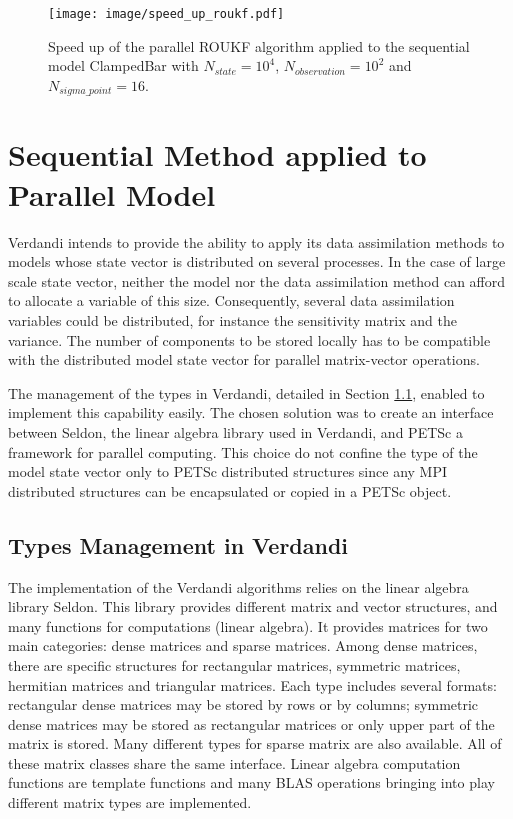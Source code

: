 \documentclass{tufte-book}
\begin{document}
 \begin{figure}
  \caption{\label{titre3} Speed up of the parallel ROUKF algorithm applied to the sequential model ClampedBar with $N_{state} = 10^4$, $N_{observation} = 10^2$ and $N_{sigma\_point} = 16$.}

\texttt{[image: image/speed\_up\_roukf.pdf]}

\end{figure}


\newpage


\hypertarget{seq-par}{}\section{Sequential Method applied to Parallel Model}\label{seq-par}

Verdandi intends to provide the ability to apply its data assimilation methods to models whose state vector is distributed on several processes. In the case of large scale state vector, neither the model nor the data assimilation method can afford to allocate a variable of this size. Consequently, several data assimilation variables
could be distributed, for instance the sensitivity matrix and the variance. The number of components to be stored locally has to be compatible with the distributed model state vector for parallel matrix-vector operations.

The management of the types in Verdandi, detailed in Section \ref{seq-par-type}, enabled to implement this capability easily. The chosen solution was to create an interface between Seldon, the linear algebra library used in Verdandi, and PETSc a framework for parallel computing. This choice do not confine the type of the model state vector only to PETSc distributed structures since any MPI distributed structures can be encapsulated or copied in a PETSc object.


\hypertarget{seq-par-type}{}\subsection{Types Management in Verdandi}\label{seq-par-type}


The implementation of the Verdandi algorithms relies on the linear algebra library Seldon. This library provides different matrix and vector structures, and many functions for computations (linear algebra). It provides matrices for two main categories: dense matrices and sparse matrices. Among dense matrices, there are specific structures for rectangular matrices, symmetric matrices, hermitian matrices and triangular matrices. Each type includes several formats: rectangular dense matrices may be stored by rows or by columns; symmetric dense matrices may be stored as rectangular matrices or only upper part of the matrix is stored. Many different types
for sparse matrix are also available. All  of these matrix classes share the same interface. Linear algebra computation functions are template functions and many BLAS operations bringing into play different matrix types are implemented.
\end{document}
